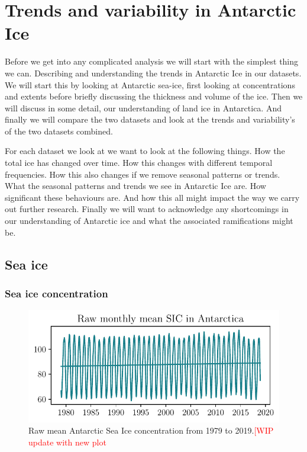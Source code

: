 \documentclass[../main.tex]{subfiles}
\begin{document}
\chapter{Trends and variability in Antarctic Ice}
Before we get into any complicated analysis we will start with the simplest thing we can. Describing and understanding the trends in Antarctic Ice in our datasets. We will start this by looking at Antarctic sea-ice, first looking at concentrations and extents before briefly discussing the thickness and volume of the ice. Then we will discuss in some detail, our understanding of land ice in Antarctica. And finally we will compare the two datasets and look at the trends and variability's of the two datasets combined.

For each dataset we look at we want to look at the following things. How the total ice has changed over time. How this changes with different temporal frequencies. How this also changes if we remove seasonal patterns or trends. What the seasonal patterns and trends we see in Antarctic Ice are. How significant these behaviours are. And how this all might impact the way we carry out further research. Finally we will want to acknowledge any shortcomings in our understanding of Antarctic ice and what the associated ramifications might be.



\section{Sea ice}
\subsection{Sea ice concentration}
\begin{figure}[H]
    \centering
    \includegraphics{images/timeseries/SIC/raw_monthly_1_raw.pdf}
    \caption{Raw mean Antarctic Sea Ice concentration from 1979 to 2019.\textcolor{red}{[WIP update with new plot}}
    \label{fig:sic_timeseries}
\end{figure}
\end{document}
